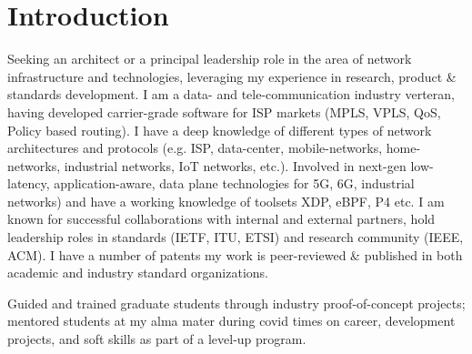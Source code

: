 \documentclass[11pt,a4paper,sans]{moderncv} %
\begin{document}
\makecvtitle %
\vspace{-13mm}
\section{Introduction}
 {Seeking an architect or a principal leadership role in the area of network infrastructure and technologies, leveraging my experience in research, product \& standards development.}
 {I am a data- and tele-communication industry  verteran, having developed carrier-grade software for ISP markets (MPLS, VPLS, QoS, Policy based routing). I have a deep knowledge of different types of network architectures and protocols (e.g. ISP, data-center, mobile-networks, home-networks, industrial networks, IoT networks, etc.). Involved in next-gen low-latency, application-aware, data plane technologies for 5G, 6G, industrial networks) and have a working knowledge of toolsets XDP, eBPF, P4 etc. I am known for successful collaborations with internal and external partners, hold leadership roles in standards (IETF, ITU, ETSI) and research community (IEEE, ACM). \newline I have a number of patents my work is peer-reviewed \& published in both academic and industry standard organizations.}

  {Guided and trained graduate students through industry proof-of-concept projects; mentored students at my alma mater during covid times on career, development projects, and soft skills as part of a level-up program.}


\end{document}
